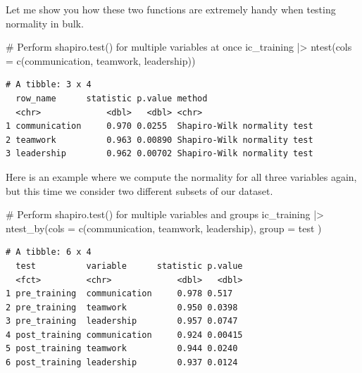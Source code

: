 \documentclass[
  letterpaper,
]{krantz}
\makeatletter
\newenvironment{Shaded}{\begin{snugshade}}{\end{snugshade}}
\newcommand{\AttributeTok}[1]{\textcolor[rgb]{0.40,0.45,0.13}{#1}}
\newcommand{\CommentTok}[1]{\textcolor[rgb]{0.37,0.37,0.37}{#1}}
\newcommand{\FunctionTok}[1]{\textcolor[rgb]{0.28,0.35,0.67}{#1}}
\newcommand{\NormalTok}[1]{\textcolor[rgb]{0.00,0.23,0.31}{#1}}
\newcommand{\SpecialCharTok}[1]{\textcolor[rgb]{0.37,0.37,0.37}{#1}}
\newenvironment{kframe}{%
\medskip{}
\setlength{\fboxsep}{.8em}
 \def\at@end@of@kframe{}%
 \ifinner\ifhmode%
  \def\at@end@of@kframe{\end{minipage}}%
  \begin{minipage}{\columnwidth}%
 \fi\fi%
 \def\FrameCommand##1{\hskip\@totalleftmargin \hskip-\fboxsep
 \colorbox{shadecolor}{##1}\hskip-\fboxsep
     \hskip-\linewidth \hskip-\@totalleftmargin \hskip\columnwidth}%
 \MakeFramed {\advance\hsize-\width
   \@totalleftmargin\z@ \linewidth\hsize
   \@setminipage}}%
 {\par\unskip\endMakeFramed%
 \at@end@of@kframe}
\renewenvironment{Shaded}{\begin{kframe}}{\end{kframe}}
\makeatother
\begin{document}
Let me show you how these two functions are extremely handy when testing
normality in bulk.

\begin{Shaded}
\begin{Highlighting}[]
\CommentTok{\# Perform \textquotesingle{}shapiro.test()\textquotesingle{} for multiple variables at once}
\NormalTok{ic\_training }\SpecialCharTok{|\textgreater{}} \FunctionTok{ntest}\NormalTok{(}\AttributeTok{cols =} \FunctionTok{c}\NormalTok{(communication,}
\NormalTok{                              teamwork,}
\NormalTok{                              leadership))}
\end{Highlighting}
\end{Shaded}

\begin{verbatim}
# A tibble: 3 x 4
  row_name      statistic p.value method                     
  <chr>             <dbl>   <dbl> <chr>                      
1 communication     0.970 0.0255  Shapiro-Wilk normality test
2 teamwork          0.963 0.00890 Shapiro-Wilk normality test
3 leadership        0.962 0.00702 Shapiro-Wilk normality test
\end{verbatim}

Here is an example where we compute the normality for all three
variables again, but this time we consider two different subsets of our
dataset.

\begin{Shaded}
\begin{Highlighting}[]
\CommentTok{\# Perform \textquotesingle{}shapiro.test()\textquotesingle{} for multiple variables and groups}
\NormalTok{ic\_training }\SpecialCharTok{|\textgreater{}} \FunctionTok{ntest\_by}\NormalTok{(}\AttributeTok{cols =} \FunctionTok{c}\NormalTok{(communication,}
\NormalTok{                                 teamwork,}
\NormalTok{                                 leadership),}
                        \AttributeTok{group =}\NormalTok{ test}
\NormalTok{                        )}
\end{Highlighting}
\end{Shaded}

\begin{verbatim}
# A tibble: 6 x 4
  test          variable      statistic p.value
  <fct>         <chr>             <dbl>   <dbl>
1 pre_training  communication     0.978 0.517  
2 pre_training  teamwork          0.950 0.0398 
3 pre_training  leadership        0.957 0.0747 
4 post_training communication     0.924 0.00415
5 post_training teamwork          0.944 0.0240 
6 post_training leadership        0.937 0.0124 
\end{verbatim}
\end{document}

